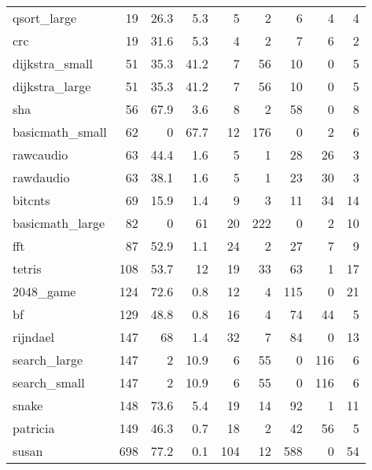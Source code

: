 \begin{tabular}{lrrrrrrrr}
 qsort\_large     &       19 &     26.3 &    5.3 &    5 &    2 &      6 &     4 &     4 \\
 crc             &       19 &     31.6 &    5.3 &    4 &    2 &      7 &     6 &     2 \\
 dijkstra\_small  &       51 &     35.3 &   41.2 &    7 &   56 &     10 &     0 &     5 \\
 dijkstra\_large  &       51 &     35.3 &   41.2 &    7 &   56 &     10 &     0 &     5 \\
 sha             &       56 &     67.9 &    3.6 &    8 &    2 &     58 &     0 &     8 \\
 basicmath\_small &       62 &      0   &   67.7 &   12 &  176 &      0 &     2 &     6 \\
 rawcaudio       &       63 &     44.4 &    1.6 &    5 &    1 &     28 &    26 &     3 \\
 rawdaudio       &       63 &     38.1 &    1.6 &    5 &    1 &     23 &    30 &     3 \\
 bitcnts         &       69 &     15.9 &    1.4 &    9 &    3 &     11 &    34 &    14 \\
 basicmath\_large &       82 &      0   &   61   &   20 &  222 &      0 &     2 &    10 \\
 fft             &       87 &     52.9 &    1.1 &   24 &    2 &     27 &     7 &     9 \\
 tetris          &      108 &     53.7 &   12   &   19 &   33 &     63 &     1 &    17 \\
 2048\_game       &      124 &     72.6 &    0.8 &   12 &    4 &    115 &     0 &    21 \\
 bf              &      129 &     48.8 &    0.8 &   16 &    4 &     74 &    44 &     5 \\
 rijndael        &      147 &     68   &    1.4 &   32 &    7 &     84 &     0 &    13 \\
 search\_large    &      147 &      2   &   10.9 &    6 &   55 &      0 &   116 &     6 \\
 search\_small    &      147 &      2   &   10.9 &    6 &   55 &      0 &   116 &     6 \\
 snake           &      148 &     73.6 &    5.4 &   19 &   14 &     92 &     1 &    11 \\
 patricia        &      149 &     46.3 &    0.7 &   18 &    2 &     42 &    56 &     5 \\
 susan           &      698 &     77.2 &    0.1 &  104 &   12 &    588 &     0 &    54 \\

\end{tabular}
